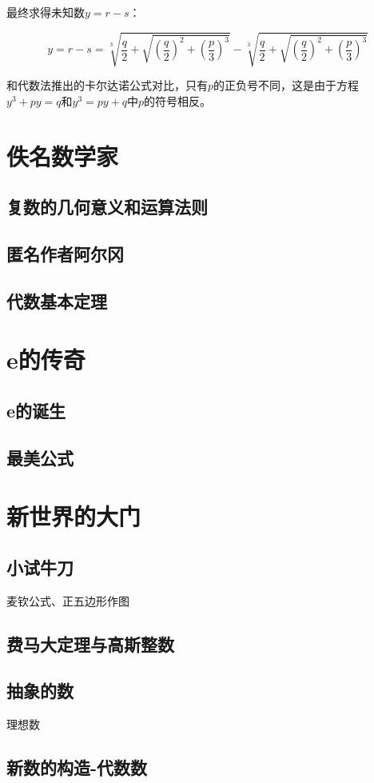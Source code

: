 \documentclass[b5paper]{ctexart}
\begin{document}
最终求得未知数$y = r - s$：

\[
y = r - s = \sqrt[3]{\frac{q}{2} + \sqrt{(\frac{q}{2})^2 + (\frac{p}{3})^3}} - \sqrt[3]{\frac{q}{2} + \sqrt{(\frac{q}{2})^2 + (\frac{p}{3})^3}}
\]

和代数法推出的卡尔达诺公式对比，只有$p$的正负号不同，这是由于方程$y^3 + py = q$和$y^3 = py + q$中$p$的符号相反。

\section{佚名数学家}
\subsection{复数的几何意义和运算法则}
\subsection{匿名作者阿尔冈}
\subsection{代数基本定理}

\section{e的传奇}
\subsection{e的诞生}
\subsection{最美公式}

\section{新世界的大门}
\subsection{小试牛刀}
麦钦公式、正五边形作图
\subsection{费马大定理与高斯整数}
\subsection{抽象的数}
理想数
\subsection{新数的构造-代数数}
\end{document}
